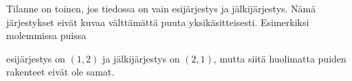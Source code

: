 Tilanne on toinen, jos tiedossa on vain
esijärjestys ja jälkijärjestys.
Nämä järjestykset eivät
kuvaa välttämättä puuta yksikäsitteisesti.
Esimerkiksi molemmissa puissa

\begin{center}
\end{center}

esijärjestys on $(1,2)$ ja jälkijärjestys on $(2,1)$,
mutta siitä huolimatta puiden rakenteet eivät ole samat.